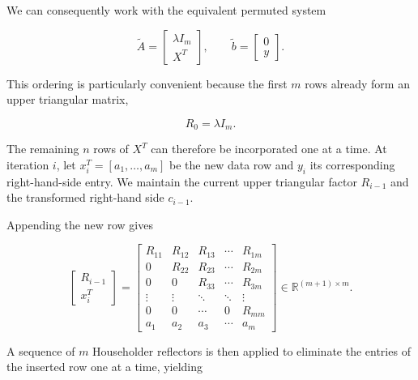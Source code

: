 \documentclass[11pt,a4paper]{article}
\newcommand{\R}{\mathbb{R}}
\begin{document}
We can consequently work with the equivalent permuted system

\begin{equation}
    \label{eq:permuted_augmented} \tilde{A} = \begin{bmatrix} \lambda I_m \\ X^T \end{bmatrix}, \qquad \tilde{b} = \begin{bmatrix} 0 \\ y \end{bmatrix}.
\end{equation}

This ordering is particularly convenient because the first $m$ rows already form an upper triangular matrix,

\begin{equation}
    R_0=\lambda I_m.
\end{equation}

The remaining $n$ rows of $X^T$ can therefore be incorporated one at a time.
At iteration $i$, let $x_i^T = [a_1,\ldots,a_m]$ be the new data row and $y_i$ its corresponding right-hand-side entry. We maintain the current upper triangular factor $R_{i-1}$ and the transformed right-hand side $c_{i-1}$.

Appending the new row gives

\begin{equation}
    \begin{bmatrix}
        R_{i-1} \\
        x_i^T
    \end{bmatrix}
    =
    \begin{bmatrix}
        R_{11} & R_{12} & R_{13} & \cdots & R_{1m} \\
        0      & R_{22} & R_{23} & \cdots & R_{2m} \\
        0      & 0      & R_{33} & \cdots & R_{3m} \\
        \vdots & \vdots & \ddots & \ddots & \vdots \\
        0      & 0      & \cdots & 0      & R_{mm} \\
        a_1    & a_2    & a_3    & \cdots & a_m
    \end{bmatrix}
    \in \R^{(m+1)\times m}.
\end{equation}

A sequence of $m$ Householder reflectors is then applied to eliminate the entries of the inserted row one at a time, yielding
\end{document}
